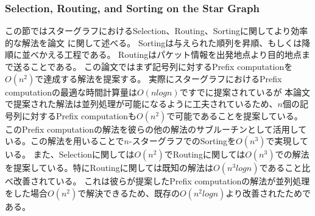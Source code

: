 \documentclass[11pt,a4j]{jsarticle}
\theoremstyle{plain}
\begin{document}
\subsubsection{Selection, Routing, and Sorting on the Star Graph}
この節ではスターグラフにおけるSelection、Routing、Sortingに関してより効率的な解法を論文 \cite{star-routing}に関して述べる。\newline
Sortingは与えられた順列を昇順、もしくは降順に並べかえる工程である。\newline
Routingはパケット情報を出発地点より目的地点まで送ることである。\newline
この論文ではまず記号列に対するPrefix computationを$O(n^2)$で達成する解法を提案する。
実際にスターグラフにおけるPrefix computationの最適な時間計算量は$O(nlogn)$ですでに提案されている\cite{star-optimal-prefix-computation}が
本論文で提案された解法は並列処理が可能になるように工夫されているため、$n$個の記号列に対するPrefix computationも$O(n^2)$で可能であることを提案している。
このPrefix computationの解法を彼らの他の解法のサブルーチンとして活用している。この解法を用いることで$n$-スターグラフでのSortingを$O(n^3)$で実現している。
また、Selectionに関しては$O(n^2)$でRoutingに関しては$O(n^3)$での解法を提案している。特にRoutingに関しては既知の解法は$O(n^3logn)$であること比べ改善されている。
これは彼らが提案したPrefix computationの解法が並列処理をした場合$O(n^2)$で解決できるため、既存の$O(n^2logn)$より改善されたためである。
\end{document}
